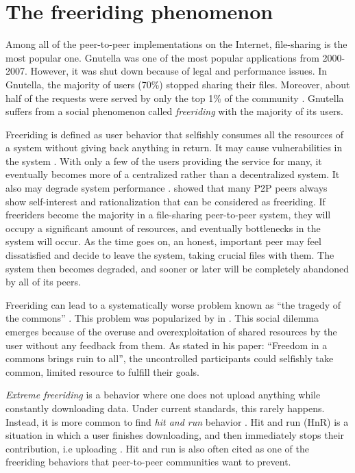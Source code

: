 \section{The freeriding phenomenon}
Among all of the peer-to-peer implementations on the Internet, file-sharing is the most popular one. Gnutella was one of the most popular applications from 2000-2007. However, it was shut down because of legal and performance issues. In Gnutella, the majority of users (70\%) stopped sharing their files. Moreover, about half of the requests were served by only the top 1\% of the community \cite{2000:freeridegnutella:adar}. Gnutella suffers from a social phenomenon called \textit{freeriding} with the majority of its users.

Freeriding is defined as user behavior that selfishly consumes all the resources of a system without giving back anything in return. It may cause vulnerabilities in the system \cite{2000:freeridegnutella:adar}. With only a few of the users providing the service for many, it eventually becomes more of a centralized rather than a decentralized system. It also may degrade system performance \cite{2000:freeridegnutella:adar}. \citeauthor{2000:freeridegnutella:adar} showed that many P2P peers always show self-interest and rationalization that can be considered as freeriding. If freeriders become the majority in a file-sharing peer-to-peer system, they will occupy a significant amount of resources, and eventually bottlenecks in the system will occur. As the time goes on, an honest, important peer may feel dissatisfied and decide to leave the system, taking crucial files with them. The system then becomes degraded, and sooner or later will be completely abandoned by all of its peers.

Freeriding can lead to a systematically worse problem known as ``the tragedy of the commons'' \cite{1968:tragedycommon:hardin}. This problem was popularized by \citet*{1968:tragedycommon:hardin} in \citeyear{1968:tragedycommon:hardin}. This social dilemma emerges because of the overuse and overexploitation of shared resources by the user without any feedback from them. As \citeauthor{1968:tragedycommon:hardin} stated in his paper: ``Freedom in a commons brings ruin to all'', the uncontrolled participants could selfishly take common, limited resource to fulfill their goals.

\textit{Extreme freeriding} is a behavior where one does not upload anything while constantly downloading data. Under current standards, this rarely happens. Instead, it is more common to find \textit{hit and run} behavior \cite{2011:managesupplydemand:meulpolder}. Hit and run (HnR) is a situation in which a user finishes downloading, and then immediately stops their contribution, i.e uploading \cite{2014:sustainabilitytorrent:chen}. Hit and run is also often cited as one of the freeriding behaviors that peer-to-peer communities want to prevent. 

